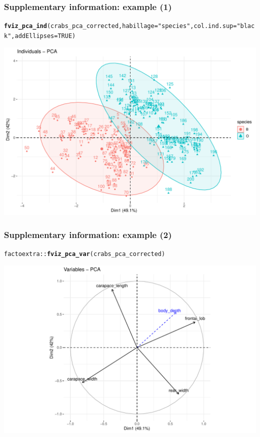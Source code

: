 \documentclass{beamer}\usepackage[]{graphicx}\usepackage[]{color}
\makeatletter
\newcommand{\hlnum}[1]{\textcolor[rgb]{0.686,0.059,0.569}{#1}}%
\newcommand{\hlstr}[1]{\textcolor[rgb]{0.192,0.494,0.8}{#1}}%
\newcommand{\hlopt}[1]{\textcolor[rgb]{0,0,0}{#1}}%
\newcommand{\hlstd}[1]{\textcolor[rgb]{0.345,0.345,0.345}{#1}}%
\newcommand{\hlkwc}[1]{\textcolor[rgb]{0.333,0.667,0.333}{#1}}%
\newcommand{\hlkwd}[1]{\textcolor[rgb]{0.737,0.353,0.396}{\textbf{#1}}}%
\newenvironment{kframe}{%
 \def\at@end@of@kframe{}%
 \ifinner\ifhmode%
  \def\at@end@of@kframe{\end{minipage}}%
  \begin{minipage}{\columnwidth}%
 \fi\fi%
 \def\FrameCommand##1{\hskip\@totalleftmargin \hskip-\fboxsep
 \colorbox{shadecolor}{##1}\hskip-\fboxsep
     \hskip-\linewidth \hskip-\@totalleftmargin \hskip\columnwidth}%
 \MakeFramed {\advance\hsize-\width
   \@totalleftmargin\z@ \linewidth\hsize
   \@setminipage}}%
 {\par\unskip\endMakeFramed%
 \at@end@of@kframe}
\newenvironment{knitrout}{}{} %
\makeatother
\begin{document}
\begin{frame}[fragile]
\frametitle{Supplementary information: example (1)}
\begin{knitrout}\scriptsize
{}\color{fgcolor}\begin{kframe}
\begin{alltt}
\hlkwd{fviz_pca_ind}\hlstd{(crabs_pca_corrected,} \hlkwc{habillage} \hlstd{=} \hlstr{"species"}\hlstd{,} \hlkwc{col.ind.sup} \hlstd{=} \hlstr{"black"}\hlstd{,} \hlkwc{addEllipses} \hlstd{=} \hlnum{TRUE}\hlstd{)}
\end{alltt}
\end{kframe}
\includegraphics[width=.8\textwidth]{figures/unnamed-chunk-3-1} 

\end{knitrout}

\end{frame}

\begin{frame}[fragile]
\frametitle{Supplementary information: example (2)}
\begin{knitrout}\scriptsize
{}\color{fgcolor}\begin{kframe}
\begin{alltt}
\hlstd{factoextra}\hlopt{::}\hlkwd{fviz_pca_var}\hlstd{(crabs_pca_corrected)}
\end{alltt}
\end{kframe}
\includegraphics[width=.8\textwidth]{figures/unnamed-chunk-4-1} 

\end{knitrout}

\end{frame}
\end{document}
